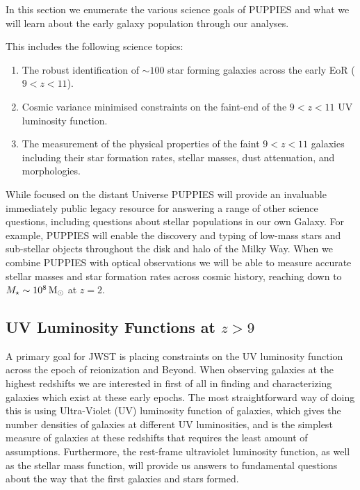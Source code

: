 \documentclass[12pt]{article}
\begin{document}
\noindent In this section we enumerate the various science goals of PUPPIES and what we will learn about the early galaxy population through our analyses.

This includes the following science topics:

\begin{enumerate}
\item The robust identification of $\sim 100$ star forming galaxies across the early EoR ($9<z<11$).
\item Cosmic variance minimised constraints on the faint-end of the $9<z<11$ UV luminosity function. 
\item The measurement of the physical properties of the faint $9<z<11$ galaxies including their star formation rates, stellar masses, dust attenuation, and morphologies. 
\end{enumerate}

While focused on the distant Universe PUPPIES will provide an invaluable immediately public legacy resource for answering a range of other science questions, including questions about stellar populations in our own Galaxy. For example, PUPPIES will enable the discovery and typing of low-mass stars and sub-stellar objects throughout the disk and halo of the Milky Way. When we combine PUPPIES with optical observations we will be able to measure accurate stellar masses and star formation rates across cosmic history, reaching down to $M_{\star}\sim 10^{8}\,{\rm M_{\odot}}$ at $z=2$.


\subsection*{\bf UV Luminosity Functions at $z > 9$}\label{sec:UVLF}

A primary goal for JWST is placing constraints on the UV luminosity function across the epoch of reionization and Beyond. When observing galaxies at the highest redshifts we are interested in first of all in finding and characterizing galaxies which exist at these early epochs.  The most straightforward way of doing this is using Ultra-Violet (UV) luminosity function of galaxies, which gives the number densities of galaxies at different UV luminosities, and is the simplest measure of galaxies at these redshifts that requires the least amount of assumptions.  Furthermore, the rest-frame ultraviolet luminosity function, as well as the stellar mass function, will provide us answers to fundamental questions about the way that the first galaxies and stars formed.
\end{document}
